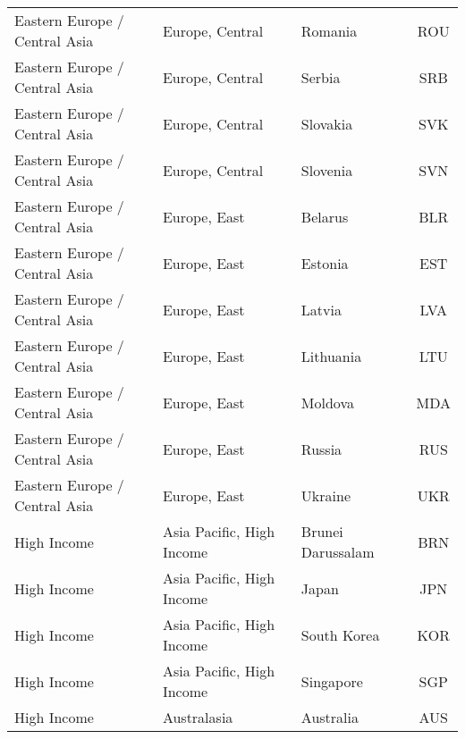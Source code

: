 \begin{longtable}{|p{3cm}|p{3.5cm}|p{5cm}|c|}
 Eastern Europe / Central Asia &              Europe, Central &                                           Romania &  ROU \\
 Eastern Europe / Central Asia &              Europe, Central &                                            Serbia &  SRB \\
 Eastern Europe / Central Asia &              Europe, Central &                                          Slovakia &  SVK \\
 Eastern Europe / Central Asia &              Europe, Central &                                          Slovenia &  SVN \\
 Eastern Europe / Central Asia &                 Europe, East &                                           Belarus &  BLR \\
 Eastern Europe / Central Asia &                 Europe, East &                                           Estonia &  EST \\
 Eastern Europe / Central Asia &                 Europe, East &                                            Latvia &  LVA \\
 Eastern Europe / Central Asia &                 Europe, East &                                         Lithuania &  LTU \\
 Eastern Europe / Central Asia &                 Europe, East &                                           Moldova &  MDA \\
 Eastern Europe / Central Asia &                 Europe, East &                                            Russia &  RUS \\
 Eastern Europe / Central Asia &                 Europe, East &                                           Ukraine &  UKR \\
                   High Income &    Asia Pacific, High Income &                                 Brunei Darussalam &  BRN \\
                   High Income &    Asia Pacific, High Income &                                             Japan &  JPN \\
                   High Income &    Asia Pacific, High Income &                                       South Korea &  KOR \\
                   High Income &    Asia Pacific, High Income &                                         Singapore &  SGP \\
                   High Income &                  Australasia &                                         Australia &  AUS \\

\end{longtable}
